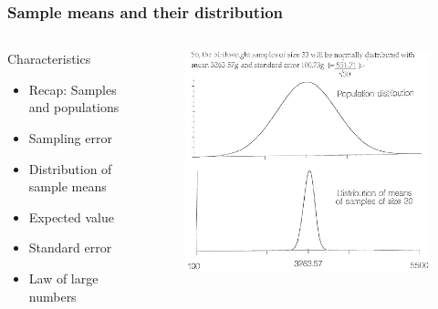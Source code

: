 \documentclass[10pt, compress]{beamer}
\begin{document}
\begin{frame}
    \frametitle{Sample means and their distribution}
    \begin{columns}
        \begin{block}{Characteristics}
            \begin{itemize}
                \item Recap: Samples and populations
                \item Sampling error
                \item Distribution of sample means
                \item Expected value
                \item Standard error
                \item Law of large numbers
            \end{itemize}
        \end{block}
        \begin{block}{}
            \begin{figure}
                \begin{center}
                    \includegraphics[scale=0.3]{img/14_diag_b.png}
                \end{center}
            \end{figure}
        \end{block}
    \end{columns}
\end{frame}
\end{document}
